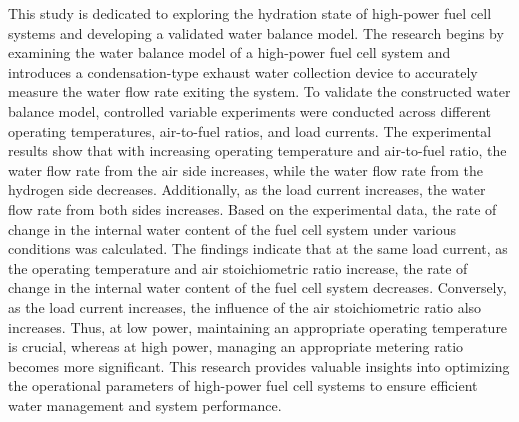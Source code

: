 \par
This study is dedicated to exploring the hydration state of high-power fuel cell systems and developing a validated water balance model. The research begins by examining the water balance model of a high-power fuel cell system and introduces a condensation-type exhaust water collection device to accurately measure the water flow rate exiting the system.
To validate the constructed water balance model, controlled variable experiments were conducted across different operating temperatures, air-to-fuel ratios, and load currents. The experimental results show that with increasing operating temperature and air-to-fuel ratio, the water flow rate from the air side increases, while the water flow rate from the hydrogen side decreases. Additionally, as the load current increases, the water flow rate from both sides increases.
Based on the experimental data, the rate of change in the internal water content of the fuel cell system under various conditions was calculated. The findings indicate that at the same load current, as the operating temperature and air stoichiometric ratio increase, the rate of change in the internal water content of the fuel cell system decreases. Conversely, as the load current increases, the influence of the air stoichiometric ratio also increases.
Thus, at low power, maintaining an appropriate operating temperature is crucial, whereas at high power, managing an appropriate metering ratio becomes more significant. This research provides valuable insights into optimizing the operational parameters of high-power fuel cell systems to ensure efficient water management and system performance.

